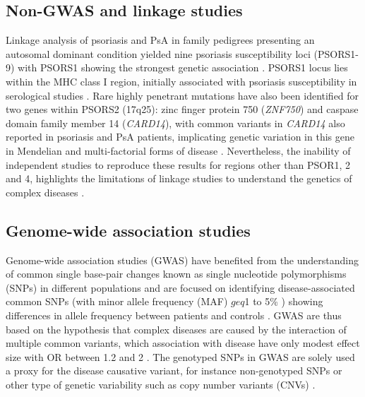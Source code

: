 \subsection{Non-GWAS and linkage studies}

Linkage analysis of psoriasis and PsA in family pedigrees presenting an autosomal dominant condition yielded nine psoriasis susceptibility loci (PSORS1-9) with PSORS1 showing the strongest genetic association \parencite{Capon2017, Consortium2003}. PSORS1 locus lies within the MHC class I region, initially associated with psoriasis susceptibility in serological studies \parencite{Russell1972, Tiilikainen1980}. Rare highly penetrant mutations have also been identified for two genes within PSORS2 (17q25): zinc finger protein 750 (\textit{ZNF750}) and caspase domain family member 14 (\textit{CARD14}), with common variants in \textit{CARD14} also reported in psoriasis and PsA patients, implicating genetic variation in this gene in Mendelian and multi-factorial forms of disease \parencite{Tomfohrde1994,Jordan2012, Jordan2012a,Tsoi2012}. Nevertheless, the inability of independent studies to reproduce these results for regions other than PSOR1, 2 and 4, highlights the limitations of linkage studies to understand the genetics of complex diseases \parencite{Capon2017}. 





\subsection{Genome-wide association studies}

Genome-wide association studies (GWAS) have benefited from the understanding of common single base-pair changes known as single nucleotide polymorphisms (SNPs) in different populations and are focused on identifying disease-associated common SNPs (with minor allele frequency (MAF) $geq$1 to 5\% ) showing differences in allele frequency between patients and controls \parencite{Ku2010}. GWAS are thus based on the hypothesis that complex diseases are caused by the interaction of multiple common variants, which association with disease have only modest effect size with OR between 1.2 and 2 \parencite{Schork2009, Cui2010}. The genotyped SNPs in GWAS are solely used a proxy for the disease causative variant, for instance non-genotyped SNPs or other type of genetic variability such as copy number variants (CNVs) \parencite{Hirschhorn2005, Ku2010}.

